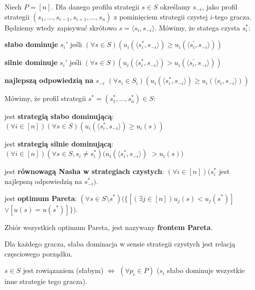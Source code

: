 \begin{definicja}
    Niech $P = [n]$. Dla danego profilu strategii $s \in S$ określamy $s_{-i}$,
    jako profil strategii $(s_1, \dots, s_{i-1}, s_{i+1}, \dots, s_n)$ z pominięciem strategii czystej $i$-tego gracza.
    Będziemy wtedy zapisywać skrótowo $s = \langle s_i, s_{-i} \rangle$.
    Mówimy, że statega czysta $s_{i}^{*}$:
    \begin{enumerate*}[label=\roman*)]
        \item \textbf{słabo dominuje} $s_{i}'$ jeśli $(\forall s \in S)(u_i(\langle s_{i}^{*}, s_{-i} \rangle) \geq u_i(\langle s_{i}^{'}, s_{-i} \rangle))$
        \item \textbf{silnie dominuje} $s_{i}'$ jeśli $(\forall s \in S)(u_i(\langle s_{i}^{*}, s_{-i} \rangle) > u_i(\langle s_{i}^{'}, s_{-i} \rangle))$
        \item \textbf{najlepszą odpowiedzią na} $s_{-i}$ $(\forall s_i \in S_i)(u_i(\langle s_{i}^{*}, s_{-i} \rangle) \geq u_i(\langle s_{i}, s_{-i} \rangle))$
    \end{enumerate*}
    Mówimy, że profil strategii $s^{*} = (s_{1}^{*}, \dots, s_{n}^{*}) \in S$:
    \begin{enumerate*}[label=\roman*)]
        \item jest \textbf{strategią słabo dominującą}: $(\forall i \in [n])(\forall s \in S)(u_i(\langle s_{i}^{*}, s_{-i} \rangle) \geq u_i(s))$
        \item jest \textbf{strategią silnie dominującą}: $(\forall i \in [n])(\forall s \in S, s_i \neq s_{i}^{*})(u_i(\langle s_{i}^{*}, s_{-i} \rangle)$ $> u_i(s))$
        \item jest \textbf{równowagą Nasha w strategiach czystych}: $(\forall i \in [n]) (s_{i}^{*}$ jest najlepszą odpowiedzią na $s_{-i}^{*})$.
        \item jest \textbf{optimum Pareta}: $(\forall s \in S\setminus{s^{*}})(\{[(\exists j \in [n])u_{j}(s) < u_{j}(s^{*})]$ $\lor [u(s) = u(s^{*})]\})$.
    \end{enumerate*}
    Zbiór wszystkich optimum Pareta, jest nazywany \textbf{frontem Pareta}.
\end{definicja}
\begin{fakt}
    Dla każdego gracza, słaba dominacja w sensie strategii czystych jest relacją częsciowego porządku.
\end{fakt}
\begin{fakt}
    $s \in S$ jest rowiązaniem (słabym) $\Leftrightarrow$ $(\forall p_i \in P)$ ($s_i$ słabo dominuje wszystkie inne strategie tego gracza).
\end{fakt}

